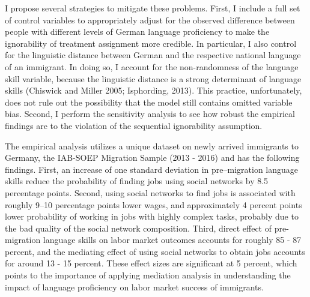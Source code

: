 \documentclass[12pt,a4paper]{article}
\begin{document}
I propose several strategies to mitigate these problems. First, I include a full set of control variables to appropriately adjust for the observed difference between people with different levels of German language proficiency to make the ignorability of treatment assignment more credible. In particular, I also control for the linguistic distance between German and the respective national language of an immigrant. In doing so, I account for the non-randomness of the language skill variable, because the linguistic distance is a strong determinant of language skills (Chiswick and Miller 2005; Isphording, 2013). This practice, unfortunately, does not rule out the possibility that the model still contains omitted variable bias. Second, I perform the sensitivity analysis to see how robust the empirical findings are to the violation of the sequential ignorability assumption. 



The empirical analysis utilizes a unique dataset on newly arrived immigrants to Germany, the IAB-SOEP Migration Sample (2013 - 2016) and has the following findings. First, an increase of one standard deviation in pre--migration language skills reduce the probability of finding jobs using social networks by 8.5 percentage points. Second, using social networks to find jobs is associated with roughly 9--10 percentage points lower wages, and approximately 4 percent points lower probability of working in jobs with highly complex tasks, probably due to the bad quality of the social network composition. Third, direct effect of pre-migration language skills on labor market outcomes accounts for roughly 85 - 87 percent, and the mediating effect of using social networks to obtain jobs accounts for around 13 - 15 percent. These effect sizes are significant at 5 percent, which points to the importance of applying mediation analysis in understanding the impact of language proficiency on labor market success of immigrants.
\end{document}
